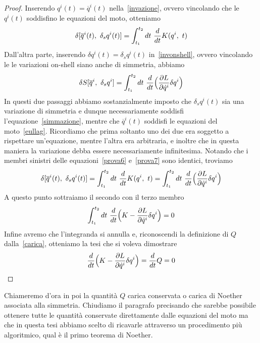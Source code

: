     \begin{proof}
        Inserendo $q^i(t) = \overline q^i(t)$ nella~\eqref{invazione}, ovvero vincolando che le $q^i(t)$ soddisfino le equazioni del moto, otteniamo 
    \begin{equation}\label{prova6}
        \delta[\overline q^i(t), ~\delta_s q^i(t)] = \int_{t_1}^{t_2}dt~ \frac{d}{dt} K(q^i, ~t)
    \end{equation}
        Dall'altra parte, inserendo $\delta q^i(t) = \delta_s q^i(t)$ in~\eqref{invonshell}, ovvero vincolando le le variazioni on-shell siano anche di simmetria, abbiamo
    \begin{equation}\label{prova7}
        \delta S[\overline q^i,~\delta_s q^i] = \int_{t_1}^{t_2}dt~ \frac{d}{dt} \Big( \frac{\partial L}{\partial\dot q^i} \delta q^i \Big )
    \end{equation}
        In questi due passaggi abbiamo sostanzialmente imposto che $\delta_s q^i(t)$ sia una variazione di simmetria e dunque necessariamente soddisfi l'equazione~\eqref{simmazione}, mentre che $\overline q^i(t)$ soddisfi le equazioni del moto~\eqref{eullag}. Ricordiamo che prima soltanto uno dei due era soggetto a rispettare un'equazione, mentre l'altra era arbitraria, e inoltre che in questa maniera la variazione debba essere necessariamente infinitesima. Notando che i membri sinistri delle equazioni~\eqref{prova6} e~\eqref{prova7} sono identici, troviamo
    \begin{equation}
        \delta[\overline q^i(t), ~\delta_s q^i(t)] = \int_{t_1}^{t_2}dt~ \frac{d}{dt} K(q^i, ~t) = \int_{t_1}^{t_2}dt~ \frac{d}{dt} \Big( \frac{\partial L}{\partial\dot q^i} \delta q^i \Big )
    \end{equation}
        A questo punto sottraiamo il secondo con il terzo membro
    \begin{equation}
        \int_{t_1}^{t_2}dt~ \frac{d}{dt} \Big (K - \frac{\partial L}{\partial\dot q^i} \delta q^i \Big ) = 0
    \end{equation}
        Infine avremo che l'integranda si annulla e, riconoscendi la definizione di $Q$ dalla~\eqref{carica}, otteniamo la tesi che si voleva dimostrare
    \begin{equation}
        \frac{d}{dt} \Big (K - \frac{\partial L}{\partial\dot q^i} \delta q^i \Big ) = \frac{d}{dt} Q = 0
    \end{equation}
    \end{proof}
    Chiameremo d'ora in poi la quantità $Q$ carica conservata o carica di Noether associata alla simmetria. Chiudiamo il paragrafo precisando che sarebbe possibile ottenere tutte le quantità conservate direttamente dalle equazioni del moto ma che in questa tesi abbiamo scelto di ricavarle attraverso un procedimento più algoritmico, qual è il primo teorema di Noether. 

